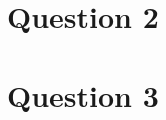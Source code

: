 \documentclass[12pt]{article}
\begin{document}
\begin{enumerate}[a.]
\end{enumerate}

\section*{Question 2}

\section*{Question 3}
\end{document}
